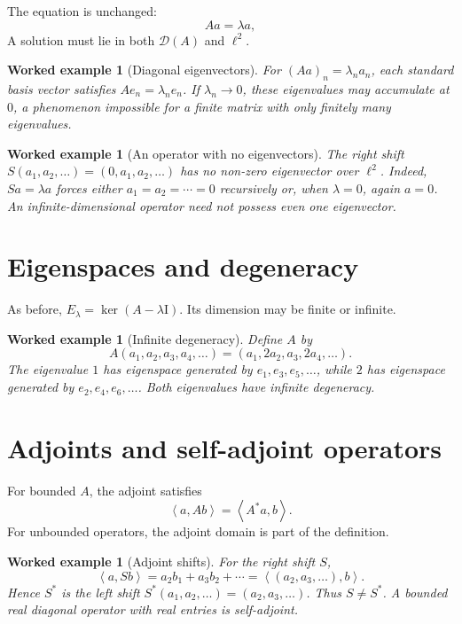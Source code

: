 \documentclass[11pt,a5paper,oneside,openany]{scrreprt}
\theoremstyle{notes}
\theoremstyle{definitions}
\newtheorem{example}[theorem]{Worked example}
\newcommand{\ip}[2]{\left\langle #1,#2\right\rangle}
\newcommand{\Ker}{\operatorname{ker}}
\newcommand{\Id}{\mathrm{I}}
\begin{document}
The equation is unchanged:
\[
  Aa=\lambda a,
\]
A solution must lie in both $\mathcal D(A)$ and $\ell^2$.

\begin{example}[Diagonal eigenvectors]
For $(Aa)_n=\lambda_na_n$, each standard basis vector satisfies
$Ae_n=\lambda_ne_n$.  If $\lambda_n\to0$, these eigenvalues may accumulate at
$0$, a phenomenon impossible for a finite matrix with only finitely many
eigenvalues.
\end{example}

\begin{example}[An operator with no eigenvectors]
The right shift $S(a_1,a_2,\ldots)=(0,a_1,a_2,\ldots)$ has no non-zero
eigenvector over $\ell^2$.  Indeed, $Sa=\lambda a$ forces either
$a_1=a_2=\cdots=0$ recursively or, when $\lambda=0$, again $a=0$.
An infinite-dimensional operator need not possess even one eigenvector.
\end{example}

\section{Eigenspaces and degeneracy}

As before, $E_\lambda=\Ker(A-\lambda\Id)$.  Its dimension may be finite or
infinite.

\begin{example}[Infinite degeneracy]
Define $A$ by
\[
 A(a_1,a_2,a_3,a_4,\ldots)=(a_1,2a_2,a_3,2a_4,\ldots).
\]
The eigenvalue $1$ has eigenspace generated by $e_1,e_3,e_5,\ldots$, while
$2$ has eigenspace generated by $e_2,e_4,e_6,\ldots$.  Both eigenvalues have
infinite degeneracy.
\end{example}

\section{Adjoints and self-adjoint operators}

For bounded $A$, the adjoint satisfies
\[
  \boxed{\ip{a}{Ab}=\ip{A^*a}{b}}.
\]
For unbounded operators, the adjoint domain is part of the definition.

\begin{example}[Adjoint shifts]
For the right shift $S$,
\[
 \ip{a}{Sb}=a_2b_1+a_3b_2+\cdots
 =\ip{(a_2,a_3,\ldots)}{b}.
\]
Hence $S^*$ is the left shift $S^*(a_1,a_2,\ldots)=(a_2,a_3,\ldots)$.
Thus $S\ne S^*$.  A bounded real diagonal operator with real entries is
self-adjoint.
\end{example}
\end{document}
